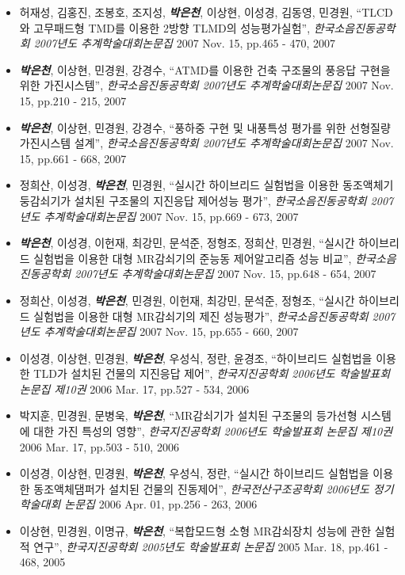 \documentclass[]{article}
\begin{document}
\begin{itemize}
\item
  허재성, 김홍진, 조봉호, 조지성, \emph{\textbf{박은천}}, 이상현, 이성경, 김동영, 민경원, ``TLCD와 고무패드형 TMD를 이용한 2방향 TLMD의 
  성능평가실험'', \emph{한국소음진동공학회 2007년도 추계학술대회논문집} 2007 Nov. 15, pp.465 - 470, 2007
\item
  \emph{\textbf{박은천}}, 이상현, 민경원, 강경수, ``ATMD를 이용한 건축 구조물의 풍응답 구현을 위한 가진시스템'', \emph{한국소음진동공학회 2007년도 추계학술대회논문집} 2007 Nov. 15, pp.210 - 215, 2007 
\item
  \emph{\textbf{박은천}}, 이상현, 민경원, 강경수, ``풍하중 구현 및 내풍특성 평가를 위한 선형질량 가진시스템 설계'', \emph{한국소음진동공학회 2007년도 추계학술대회논문집} 2007 Nov. 15, pp.661 - 668, 2007
\item
  정희산, 이성경, \emph{\textbf{박은천}}, 민경원, ``실시간 하이브리드 실험법을 이용한 동조액체기둥감쇠기가 설치된 구조물의 지진응답 제어성능 평가'', \emph{한국소음진동공학회 2007년도 추계학술대회논문집} 2007 Nov. 15, pp.669 - 673, 2007
\item
  \emph{\textbf{박은천}}, 이성경, 이헌재, 최강민, 문석준, 정형조, 정희산, 민경원, ``실시간 하이브리드 실험법을 이용한 대형 MR감쇠기의 준능동
  제어알고리즘 성능 비교'', \emph{한국소음진동공학회 2007년도 추계학술대회논문집} 2007 Nov. 15, pp.648 - 654, 2007
\item
  정희산, 이성경, \emph{\textbf{박은천}}, 민경원, 이헌재, 최강민, 문석준, 정형조, ``실시간 하이브리드 실험법을 이용한 대형 MR감쇠기의 제진 성능평가'', \emph{한국소음진동공학회 2007년도 추계학술대회논문집} 2007 Nov. 15, pp.655 - 660, 2007
\item
  이성경, 이상현, 민경원, \emph{\textbf{박은천}}, 우성식, 정란, 윤경조, ``하이브리드 실험법을 이용한 TLD가 설치된 건물의 지진응답 제어'',
  \emph{한국지진공학회 2006년도 학술발표회 논문집 제10권} 2006 Mar. 17, pp.527 - 534, 2006
\item
  박지훈, 민경원, 문병욱, \emph{\textbf{박은천}}, ``MR감쇠기가 설치된 구조물의 등가선형 시스템에 대한 가진 특성의 영향'', \emph{한국지진공학회 2006년도 학술발표회 논문집 제10권} 2006 Mar. 17, pp.503 - 510, 2006
\item
  이성경, 이상현, 민경원, \emph{\textbf{박은천}}, 우성식, 정란, ``실시간 하이브리드 실험법을 이용한 동조액체댐퍼가 설치된 건물의 진동제어'',
  \emph{한국전산구조공학회 2006년도 정기 학술대회 논문집} 2006 Apr. 01, pp.256 - 263, 2006
\item
  이상현, 민경원, 이명규, \emph{\textbf{박은천}}, ``복합모드형 소형 MR감쇠장치 성능에 관한 실험적 연구'', \emph{한국지진공학회 2005년도 학술발표회 논문집} 2005 Mar. 18, pp.461 - 468, 2005
\end{itemize}
\end{document}
